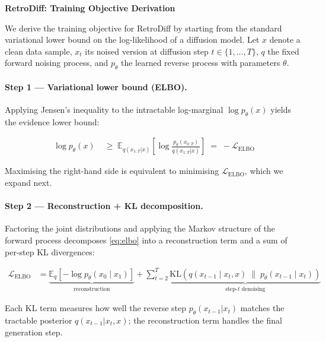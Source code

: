 \documentclass[11pt]{article}
\begin{document}
\pagestyle{empty}

\begin{center}
  {\large\bfseries RetroDiff: Training Objective Derivation}
\end{center}

\medskip

We derive the training objective for RetroDiff by starting from the
standard variational lower bound on the log-likelihood of a diffusion
model.  Let $x$ denote a clean data sample, $x_t$ its noised version at
diffusion step $t \in \{1,\dots,T\}$, $q$ the fixed forward noising
process, and $p_\theta$ the learned reverse process with parameters
$\theta$.

\paragraph{Step 1 — Variational lower bound (ELBO).}
Applying Jensen's inequality to the intractable log-marginal
$\log p_\theta(x)$ yields the evidence lower bound:

\begin{align}
  \log p_\theta(x)
    &\;\geq\;
    \mathbb{E}_{q(x_{1:T}|x)}\!\left[
      \log\frac{p_\theta(x_{0:T})}{q(x_{1:T}|x)}
    \right]
    \;=\; -\mathcal{L}_{\mathrm{ELBO}}
  \label{eq:elbo}
\end{align}

Maximising the right-hand side is equivalent to minimising
$\mathcal{L}_{\mathrm{ELBO}}$, which we expand next.

\paragraph{Step 2 — Reconstruction + KL decomposition.}
Factoring the joint distributions and applying the Markov structure of
the forward process decomposes \eqref{eq:elbo} into a reconstruction
term and a sum of per-step KL divergences:

\begin{align}
  \mathcal{L}_{\mathrm{ELBO}}
    &= \underbrace{
         \mathbb{E}_q\!\left[-\log p_\theta(x_0 \mid x_1)\right]
       }_{\text{reconstruction}}
     + \sum_{t=2}^{T}
       \underbrace{
         \mathrm{KL}\!\left(
           q(x_{t-1}\mid x_t, x)
           \;\|\;
           p_\theta(x_{t-1}\mid x_t)
         \right)
       }_{\text{step-}t\text{ denoising}}
  \label{eq:decomp}
\end{align}

Each KL term measures how well the reverse step $p_\theta(x_{t-1}|x_t)$
matches the tractable posterior $q(x_{t-1}|x_t,x)$; the reconstruction
term handles the final generation step.
\end{document}
